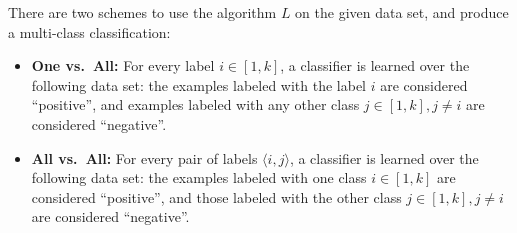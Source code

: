 \documentclass[11pt]{article}
\begin{document}
There are two schemes to use the algorithm $L$ on the given data set, and produce a multi-class classification:
\begin{itemize}
\item {\bf One vs.~All:} For every label $i \in [1,k]$, a classifier is learned over the following data set: the examples labeled with the label $i$ are considered ``positive'', and examples labeled with any other class $j \in [1,k], j \neq i$ are considered ``negative''.
\item {\bf All vs.~All:} For every pair of labels $\langle i, j \rangle$, a classifier is learned over the following data set: the examples labeled with one class $i \in [1,k]$ are considered ``positive'', and those labeled with the other class $j \in [1,k], j \neq i$ are considered ``negative''.
\end{itemize}
%
\vspace{-3mm}
\end{document}
